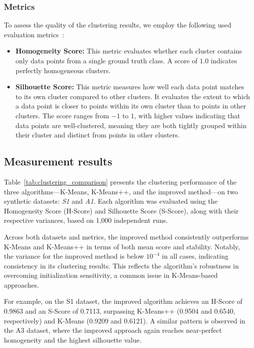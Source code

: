 \documentclass[10pt,twocolumn,letterpaper]{article}
\begin{document}
\subsubsection{Metrics}

To assess the quality of the clustering results, we employ the following used
evaluation metrics~\cite{Abdullah10601123}:

\begin{itemize}
    \item \textbf{Homogeneity Score:} This metric evaluates whether each cluster contains only data points from a single ground truth class. A score of $1.0$ indicates perfectly homogeneous clusters.
    \item \textbf{Silhouette Score:} This metric measures how well each data point matches to its own cluster compared to other clusters. It evaluates the extent to which a data point is closer to points within its own cluster than to points in other clusters. The score ranges from $-1$ to $1$, with higher values indicating that data points are well-clustered, meaning they are both tightly grouped within their cluster and distinct from points in other clusters.
\end{itemize}


\subsection{Measurement results}\label{subsec:measurement-results}

Table~\ref{tab:clustering_comparison} presents the clustering performance of
the three algorithms—K-Means, K-Means++, and the improved method—on two
synthetic datasets: \textit{S1} and \textit{A1}. Each algorithm was evaluated
using the Homogeneity Score (H-Score) and Silhouette Score (S-Score), along
with their respective variances, based on 1,000 independent runs.

Across both datasets and metrics, the improved method consistently outperforms
K-Means and K-Means++ in terms of both mean score and stability. Notably, the
variance for the improved method is below $10^{-4}$ in all cases, indicating
consistency in its clustering results. This reflects the algorithm’s robustness
in overcoming initialization sensitivity, a common issue in K-Means-based
approaches.

For example, on the S1 dataset, the improved algorithm achieves an H-Score of
0.9863 and an S-Score of 0.7113, surpassing K-Means++ (0.9504 and 0.6540,
respectively) and K-Means (0.9209 and 0.6121). A similar pattern is observed in
the A3 dataset, where the improved approach again reaches near-perfect
homogeneity and the highest silhouette value.
\end{document}
